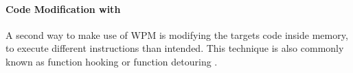 \paragraph{Code Modification with }
A second way to make use of \gls{WPM} is modifying the targets code inside memory, to execute different instructions than intended. This technique is also commonly known as function hooking or function detouring \cite{codeproject_hooking}.